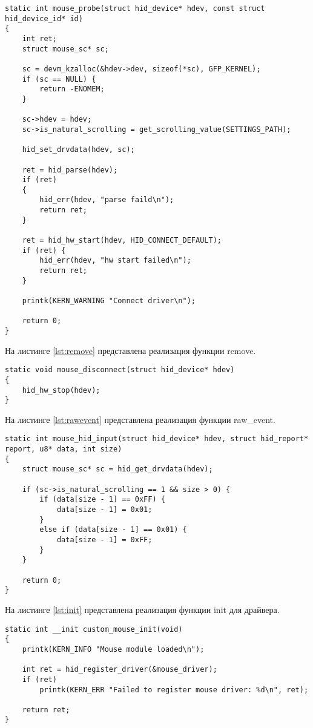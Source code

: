 \documentclass{bmstu}
\begin{document}
\begin{lstlisting}[caption={Реализация функции probe}, label=lst:probe]
static int mouse_probe(struct hid_device* hdev, const struct hid_device_id* id)
{
    int ret;
    struct mouse_sc* sc;

    sc = devm_kzalloc(&hdev->dev, sizeof(*sc), GFP_KERNEL);
    if (sc == NULL) {
        return -ENOMEM;
    }

    sc->hdev = hdev;
    sc->is_natural_scrolling = get_scrolling_value(SETTINGS_PATH);

    hid_set_drvdata(hdev, sc);

    ret = hid_parse(hdev);
    if (ret)
    {
        hid_err(hdev, "parse faild\n");
        return ret;
    }

    ret = hid_hw_start(hdev, HID_CONNECT_DEFAULT);
    if (ret) {
        hid_err(hdev, "hw start failed\n");
        return ret;
    }

    printk(KERN_WARNING "Connect driver\n");

    return 0;
}
\end{lstlisting}

\clearpage
На листинге \ref{lst:remove} представлена реализация функции remove.

\begin{lstlisting}[caption={Реализация функции remove}, label=lst:remove]
static void mouse_disconnect(struct hid_device* hdev)
{
    hid_hw_stop(hdev);
}
\end{lstlisting}

На листинге \ref{lst:rawevent} представлена реализация функции raw\_event.

\begin{lstlisting}[caption={Реализация функции raw\_event}, label=lst:rawevent]
static int mouse_hid_input(struct hid_device* hdev, struct hid_report* report, u8* data, int size)
{
    struct mouse_sc* sc = hid_get_drvdata(hdev);

    if (sc->is_natural_scrolling == 1 && size > 0) {
        if (data[size - 1] == 0xFF) {
            data[size - 1] = 0x01;
        }
        else if (data[size - 1] == 0x01) {
            data[size - 1] = 0xFF;
        }
    }

    return 0;
}
\end{lstlisting}

На листинге \ref{lst:init} представлена реализация функции init для драйвера.

\begin{lstlisting}[caption={Реализация функции init}, label=lst:init]
static int __init custom_mouse_init(void)
{
    printk(KERN_INFO "Mouse module loaded\n");

    int ret = hid_register_driver(&mouse_driver);
    if (ret)
        printk(KERN_ERR "Failed to register mouse driver: %d\n", ret);

    return ret;
}
\end{lstlisting}
\end{document}
